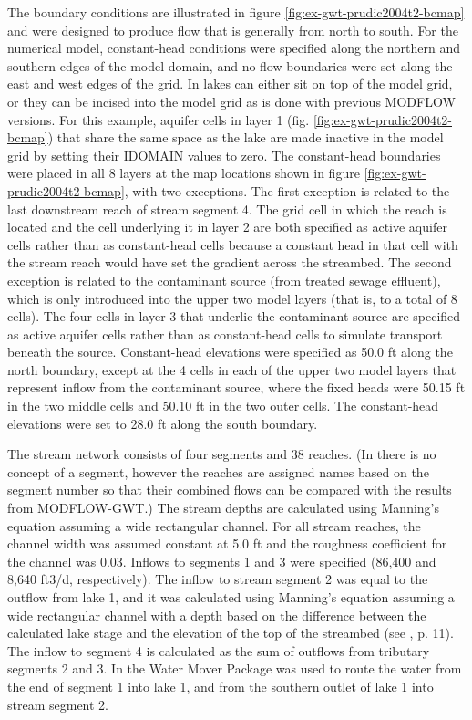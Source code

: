 

The boundary conditions are illustrated in figure \ref{fig:ex-gwt-prudic2004t2-bcmap} and were designed to produce flow that is generally from north to south. For the numerical model, constant-head conditions were specified along the northern and southern edges of the model domain, and no-flow boundaries were set along the east and west edges of the grid. In \mf lakes can either sit on top of the model grid, or they can be incised into the model grid as is done with previous MODFLOW versions.  For this example, aquifer cells in layer 1 (fig. \ref{fig:ex-gwt-prudic2004t2-bcmap}) that share the same space as the lake are made inactive in the model grid by setting their IDOMAIN values to zero. The constant-head boundaries were placed in all 8 layers at the map locations shown in figure \ref{fig:ex-gwt-prudic2004t2-bcmap}, with two exceptions.  The first exception is related to the last downstream reach of stream segment 4. The grid cell in which the reach is located and the cell underlying it in layer 2 are both specified as active aquifer cells rather than as constant-head cells because a constant head in that cell with the stream reach would have set the gradient across the streambed. The second exception is related to the contaminant source (from treated sewage effluent), which is only introduced into the upper two model layers (that is, to a total of 8 cells). The four cells in layer 3 that underlie the contaminant source are specified as active aquifer cells rather than as constant-head cells to simulate transport beneath the source. Constant-head elevations were specified as 50.0 ft along the north boundary, except at the 4 cells in each of the upper two model layers that represent inflow from the contaminant source, where the fixed heads were 50.15 ft in the two middle cells and 50.10 ft in the two outer cells. The constant-head elevations were set to 28.0 ft along the south boundary. 

The stream network consists of four segments and 38 reaches. (In \mf there is no concept of a segment, however the reaches are assigned names based on the segment number so that their combined flows can be compared with the results from MODFLOW-GWT.) The stream depths are calculated using Manning’s equation assuming a wide rectangular channel. For all stream reaches, the channel width was assumed constant at 5.0 ft and the roughness coefficient for the channel was 0.03.  Inflows to segments 1 and 3 were specified (86,400 and 8,640 ft3/d, respectively). The inflow to stream segment 2 was equal to the outflow from lake 1, and it was calculated using Manning’s equation assuming a wide rectangular channel with a depth based on the difference between the calculated lake stage and the elevation of the top of the streambed (see \cite{modflowlak3pack}, p. 11). The inflow to segment 4 is calculated as the sum of outflows from tributary segments 2 and 3.  In \mf the Water Mover Package was used to route the water from the end of segment 1 into lake 1, and from the southern outlet of lake 1 into stream segment 2.  

